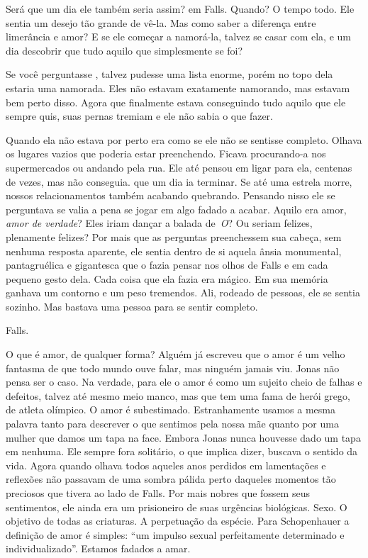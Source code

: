 Será que um dia ele também seria assim?  em Falls. Quando? O tempo todo. Ele sentia um desejo tão grande de vê-la. Mas como saber a diferença entre limerância e amor? E se ele começar a namorá-la, talvez se casar com ela, e um dia descobrir que tudo aquilo que  simplesmente se foi?

Se você perguntasse , talvez  pudesse  uma lista enorme, porém\mudanca{,} no topo dela\mudanca{,} estaria uma namorada. Eles não estavam exatamente namorando, mas estavam bem perto disso. Agora que finalmente estava conseguindo tudo aquilo que ele sempre quis, suas pernas tremiam e ele não sabia o que fazer.

Quando ela não estava por perto era como se ele não se sentisse completo. Olhava os lugares vazios que  poderia estar preenchendo. Ficava procurando-a nos supermercados ou andando pela rua. Ele até pensou em ligar para ela, centenas de vezes, mas não conseguia.  que um dia ia terminar. Se até uma estrela morre, nossos relacionamentos também acabando quebrando. Pensando nisso\mudanca{,} ele se perguntava se valia a pena se jogar em algo fadado a acabar. Aquilo era amor, \emph{amor de verdade}? Eles iriam dançar a balada de~\emph{O}? Ou seriam felizes, plenamente felizes? Por mais que as perguntas preenchessem sua cabeça, sem nenhuma resposta aparente, ele sentia dentro de si aquela ânsia monumental, pantagruélica e gigantesca que o fazia pensar nos olhos de Falls e em cada pequeno gesto dela. Cada coisa que ela fazia era mágico. Em sua memória ganhava um contorno e um peso tremendos. Ali, rodeado de pessoas, ele se sentia sozinho. Mas bastava uma pessoa para se sentir completo.

Falls.

O que é amor, de qualquer forma? Alguém já escreveu que o amor é um velho fantasma de que todo mundo ouve falar, mas ninguém jamais viu. Jonas não pensa ser o caso. Na verdade, para ele o amor é como um sujeito cheio de falhas e defeitos, talvez até mesmo meio manco, mas que tem uma fama de herói grego, de atleta olímpico. O amor é subestimado. Estranhamente usamos a mesma palavra tanto para descrever o que sentimos pela nossa mãe quanto por uma mulher que damos um tapa na face. Embora Jonas nunca houvesse dado um tapa em nenhuma. Ele sempre fora solitário, o que implica  dizer, buscava o sentido da vida. Agora\mudanca{,} quando olhava todos aqueles anos perdidos em lamentações e reflexões\mudanca{,} não passavam de uma sombra pálida perto daqueles momentos tão preciosos que tivera ao lado de Falls. Por mais nobres que fossem seus sentimentos, ele ainda era um prisioneiro de suas urgências biológicas. Sexo. O objetivo de todas as criaturas. A perpetuação da espécie. Para Schopenhauer a definição de amor é simples: ``um impulso sexual perfeitamente determinado e individualizado''. Estamos fadados a amar.

